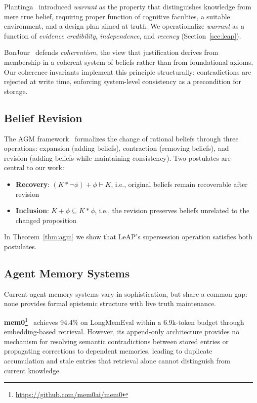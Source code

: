 \documentclass[11pt,letterpaper]{article}
\begin{document}
Plantinga~\cite{plantinga1993} introduced \textit{warrant} as the property that distinguishes knowledge from mere true belief, requiring proper function of cognitive faculties, a suitable environment, and a design plan aimed at truth. We operationalize \textit{warrant} as a function of \textit{evidence credibility}, \textit{independence}, and \textit{recency} (Section~\ref{sec:leap}).

BonJour~\cite{bonjour1985} defends \textit{coherentism}, the view that justification derives from membership in a coherent system of beliefs rather than from foundational axioms. Our coherence invariants implement this principle structurally: contradictions are rejected at write time, enforcing system-level consistency as a precondition for storage.

\subsection{Belief Revision}

The AGM framework~\cite{agm1985} formalizes the change of rational beliefs through three operations: expansion (adding beliefs), contraction (removing beliefs), and revision (adding beliefs while maintaining consistency). Two postulates are central to our work:
\begin{itemize}[noitemsep]
    \item \textbf{Recovery}: $(K * \neg\phi) + \phi \vdash K$, i.e., original beliefs remain recoverable after revision
    \item \textbf{Inclusion}: $K + \phi \subseteq K * \phi$, i.e., the revision preserves beliefs unrelated to the changed proposition
\end{itemize}

In Theorem~\ref{thm:agm} we show that LeAP's supersession operation satisfies both postulates.

\subsection{Agent Memory Systems}

Current agent memory systems vary in sophistication, but share a common gap: none provides formal epistemic structure with live truth maintenance.

\textbf{mem0}\footnote{\url{https://github.com/mem0ai/mem0}}~\cite{mem0} achieves 94.4\% on LongMemEval within a 6.9k-token budget through embedding-based retrieval. However, its append-only architecture provides no mechanism for resolving semantic contradictions between stored entries or propagating corrections to dependent memories, leading to duplicate accumulation and stale entries that retrieval alone cannot distinguish from current knowledge.
\end{document}
